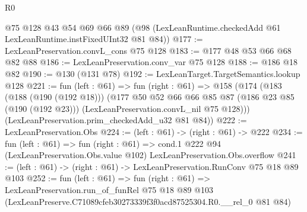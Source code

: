 \begin{lexlean}{R0}
\begin{coremodule}
    @75
    @128
    @43
    @54
    @69
    @66
    @89
    (@98 (LexLeanRuntime.checkedAdd @61 LexLeanRuntime.instFixedUInt32 @81 @84))
@177 := LexLeanPreservation.convL_cons @75 @128
@183 := @177 @48 @53 @66 @68 @82 @88
@186 := LexLeanPreservation.conv_var @75 @128
@188 := @186 @18 @82
@190 := @130 (@131 @78)
@192 := LexLeanTarget.TargetSemantics.lookup @128
@221 := fun (left : @61) =>
  fun (right : @61) =>
  @158
    (@174
      (@183
        (@188 (@190 (@192 @18)))
        (@177
          @50
          @52
          @66
          @66
          @85
          @87
          (@186 @23 @85 (@190 (@192 @23)))
          (LexLeanPreservation.convL_nil @75 @128)))
      (LexLeanPreservation.prim_checkedAdd_u32 @81 @84))
@222 := LexLeanPreservation.Obs
@224 := (left : @61) -> (right : @61) -> @222
@234 := fun (left : @61) =>
  fun (right : @61) =>
  cond.{1} @222 @94 (LexLeanPreservation.Obs.value @102) LexLeanPreservation.Obs.overflow
@241 := (left : @61) -> (right : @61) -> LexLeanPreservation.RunConv @75 @18 @89 @103
@252 := fun (left : @61) =>
  fun (right : @61) =>
  LexLeanPreservation.run_of_funRel
    @75
    @18
    @89
    @103
    (LexLeanPreserve.C71089cfeb30273339f3f0acd87525304.R0.__rel_0 @81 @84)
\end{coremodule}
\end{lexlean}
